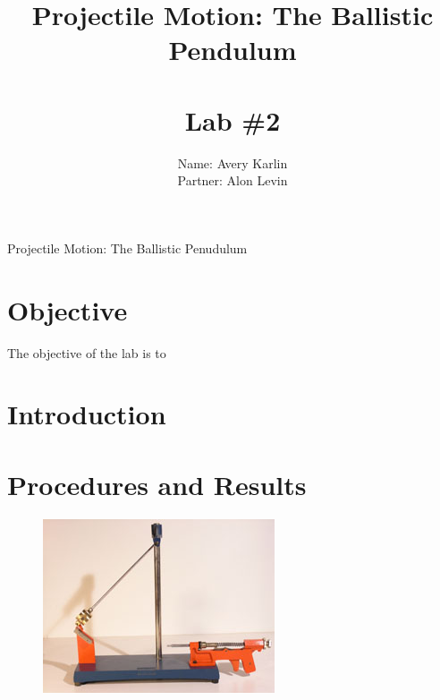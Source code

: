 \documentclass[11pt, titlepage]{article}
\title{Projectile Motion: The Ballistic Pendulum \\ \ \\ \large Lab \#2}
\author{Name: Avery Karlin \\ Partner: Alon Levin}
\date{}
\begin{document}
\maketitle

\begin{center}
\LARGE Projectile Motion: The Ballistic Penudulum
\end{center}

\section*{Objective}
The objective of the lab is to 
\section*{Introduction}

\section*{Procedures and Results}

\begin{figure}[p]
\centering
\hspace*{-10.5cm}
\includegraphics[scale=0.15, angle=270]{lab2.jpg}
\vspace*{19cm}
\end{figure}
\end{document}
